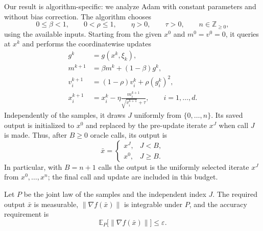 \documentclass[10pt]{article}
\theoremstyle{definition}
\begin{document}
Our result is algorithm-specific: we analyze Adam with constant parameters and without bias correction. The algorithm chooses
\[
0\leq\beta<1,\qquad 0<\rho\leq1,\qquad
\eta>0,\qquad\tau>0,\qquad n\in\mathbb{Z}_{\geq0},
\]
using the available inputs. Starting from the given $x^0$ and $m^0=v^0=0$, it queries at $x^k$ and performs the coordinatewise updates
\[
\begin{aligned}
g^k&=g(x^k,\xi_k),\\
m^{k+1}&=\beta m^k+(1-\beta)g^k,\\
v_i^{k+1}&=(1-\rho)v_i^k+\rho(g_i^k)^2,\\
x_i^{k+1}&=x_i^k-\eta\frac{m_i^{k+1}}{\sqrt{v_i^{k+1}}+\tau},
\qquad i=1,\ldots,d.
\end{aligned}
\]
Independently of the samples, it draws $J$ uniformly from $\{0,\ldots,n\}$. Its saved output is initialized to $x^0$ and replaced by the pre-update iterate $x^J$ when call $J$ is made. Thus, after $B\geq0$ oracle calls, its output is
\[
\bar{x}=
\begin{cases}
x^J,&J<B,\\
x^0,&J\geq B.
\end{cases}
\]
In particular, with $B=n+1$ calls the output is the uniformly selected iterate $x^J$ from $x^0,\ldots,x^n$; the final call and update are included in this budget.

Let $P$ be the joint law of the samples and the independent index $J$. The required output $\bar{x}$ is measurable, $\|\nabla f(\bar{x})\|$ is integrable under $P$, and the accuracy requirement is
\[
\mathbb{E}_{P}\bigl[\|\nabla f(\bar{x})\|\bigr]\leq\varepsilon.
\]
\end{document}
